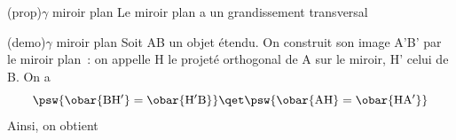 \documentclass[../../main/main.tex]{subfiles}
\begin{document}
\begin{tcb}[label=prop:mir_grand](prop){$\gamma$ miroir plan}
	Le miroir plan a un grandissement transversal
	\psw{
		\[
			\boxed{\gamma = +1}
		\]
	}
	\vspace{-20pt}
\end{tcb}
\begin{tcb}[label=demo:mir_grand, sidebyside,
		righthand ratio=.4](demo){$\gamma$ miroir plan}
	Soit AB un objet étendu. On construit son image A'B' par le miroir plan~: on
	appelle H le projeté orthogonal de A sur le miroir, H' celui de B.
	\smallbreak
	On a
	\[
		\psw{
			\obar{\rm BH'} = \obar{\rm H'B}
		}
		\qet
		\psw{
			\obar{\rm AH} = \obar{\rm HA'}
		}
	\]
	Ainsi, on obtient
	\psw{
		\[
			\boxed{\AB = \obar{\rm HH'} = \ABp}
		\]
	}
	\tcblower
	\begin{center}
		\label{fig:mir_plan-grand}
	\end{center}
\end{tcb}
\end{document}
